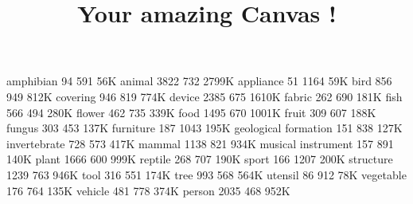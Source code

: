 \documentclass[a4paper]{article}
\title{Your amazing Canvas !}
\newcommand*{\myBoxBlack}[6]{
	\draw[black, fill=white] (#1,-#2,-#3) -- ++(-#4,0,0) -- ++(0,-#5,0) -- ++(#4,0,0) -- cycle;
	\draw[black, fill=white] (#1,-#2,-#3) -- ++(0,0,-#6) -- ++(0,-#5,0) -- ++(0,0,#6) -- cycle;
	\draw[black, fill=white] (#1,-#2,-#3) -- ++(-#4,0,0) -- ++(0,0,-#6) -- ++(#4,0,0) -- cycle;
}
\newcommand*{\myBoxBlackUnfilled}[6]{
	\draw[black] (#1,-#2,-#3) -- ++(-#4,0,0) -- ++(0,-#5,0) -- ++(#4,0,0) -- cycle;
	\draw[black] (#1,-#2,-#3) -- ++(0,0,-#6) -- ++(0,-#5,0) -- ++(0,0,#6) -- cycle;
	\draw[black] (#1,-#2,-#3) -- ++(-#4,0,0) -- ++(0,0,-#6) -- ++(#4,0,0) -- cycle;
}
\newcommand*{\myBoxGrey}[6]{
	\draw[black!60, fill=black!25] (#1,-#2,-#3) -- ++(-#4,0,0) -- ++(0,-#5,0) -- ++(#4,0,0) -- cycle;
	\draw[black!60, fill=black!25] (#1,-#2,-#3) -- ++(0,0,-#6) -- ++(0,-#5,0) -- ++(0,0,#6) -- cycle;
	\draw[black!60, fill=black!25] (#1,-#2,-#3) -- ++(-#4,0,0) -- ++(0,0,-#6) -- ++(#4,0,0) -- cycle;
}
\begin{document}
\maketitle

amphibian	94	591	56K
animal	3822	732	2799K
appliance	51	1164	59K
bird	856	949	812K
covering	946	819	774K
device	2385	675	1610K
fabric	262	690	181K
fish	566	494	280K
flower	462	735	339K
food	1495	670	1001K
fruit	309	607	188K
fungus	303	453	137K
furniture	187	1043	195K
geological formation	151	838	127K
invertebrate	728	573	417K
mammal	1138	821	934K
musical instrument	157	891	140K
plant	1666	600	999K
reptile	268	707	190K
sport	166	1207	200K
structure	1239	763	946K
tool	316	551	174K
tree	993	568	564K
utensil	86	912	78K
vegetable	176	764	135K
vehicle	481	778	374K
person	2035	468	952K



\end{document}
